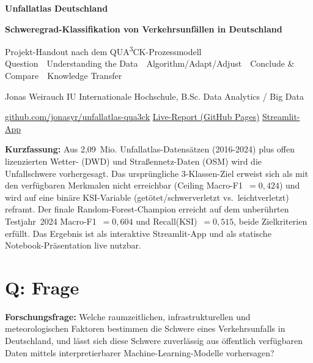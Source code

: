 \documentclass[11pt,a4paper]{article}
\begin{document}
\thispagestyle{empty}

\begin{center}
  {\Huge\bfseries\color{Accent} Unfallatlas Deutschland}\par\vspace{4pt}
  {\Large\bfseries Schweregrad-Klassifikation von Verkehrsunfällen in Deutschland}\par\vspace{6pt}
  {\small Projekt-Handout nach dem QUA\textsuperscript{3}CK-Prozessmodell\\
  Question~\textrightarrow{}~Understanding the Data~\textrightarrow{}~Algorithm/Adapt/Adjust~\textrightarrow{}~Conclude \& Compare~\textrightarrow{}~Knowledge Transfer\par\vspace{3pt}
  Jonas Weirauch \textbar{} IU Internationale Hochschule, B.Sc. Data Analytics / Big Data\par
  \href{https://github.com/jonasyr/unfallatlas-qua3ck}{github.com/jonasyr/unfallatlas-qua3ck} \textbar{}
  \href{https://jonasyr.github.io/unfallatlas-qua3ck/}{Live-Report (GitHub Pages)} \textbar{}
  \href{https://unfallatlas-qua3ck-fg5thv4lthkbhw86er3kfk.streamlit.app}{Streamlit-App}}
\end{center}

\begin{tcolorbox}[basebox]
\textbf{Kurzfassung:} Aus 2{,}09~Mio. Unfallatlas-Datensätzen (2016-2024) plus offen
lizenzierten Wetter- (DWD) und Straßennetz-Daten (OSM) wird die
Unfallschwere vorhergesagt. Das ursprüngliche 3-Klassen-Ziel erweist
sich als mit den verfügbaren Merkmalen nicht erreichbar
(Ceiling Macro-F1~$=0{,}424$) und wird auf eine binäre KSI-Variable
(getötet/schwerverletzt vs.\ leichtverletzt) reframt. Der finale
Random-Forest-Champion erreicht auf dem unberührten Testjahr~2024
Macro-F1~$=0{,}604$ und Recall(KSI)~$=0{,}515$, beide Zielkriterien
erfüllt. Das Ergebnis ist als interaktive Streamlit-App und als
statische Notebook-Präsentation live nutzbar.
\end{tcolorbox}

\section{Q: Frage}
\textbf{Forschungsfrage:} Welche raumzeitlichen, infrastrukturellen und
meteorologischen Faktoren bestimmen die Schwere eines Verkehrsunfalls in
Deutschland, und lässt sich diese Schwere zuverlässig aus öffentlich
verfügbaren Daten mittels interpretierbarer Machine-Learning-Modelle
vorhersagen?
\end{document}
